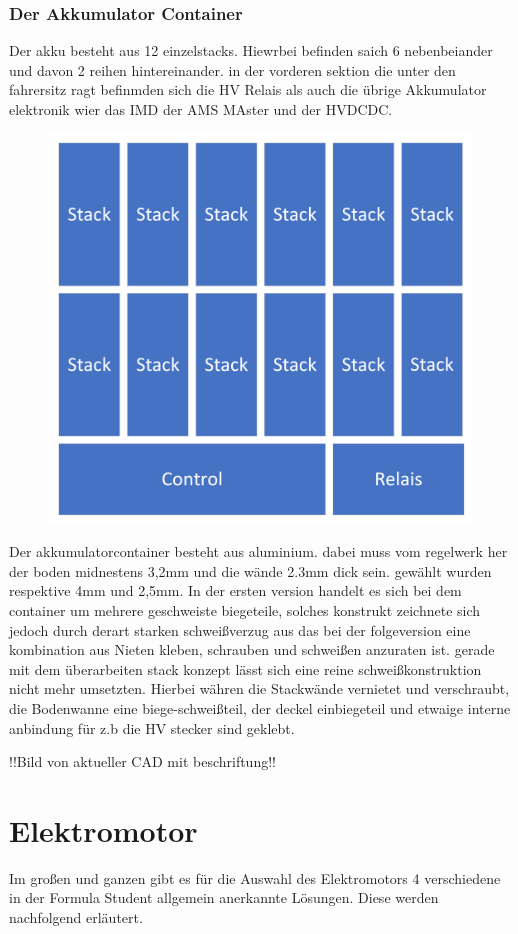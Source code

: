 \FloatBarrier
\subsubsection{Der Akkumulator Container}

Der akku besteht aus 12 einzelstacks. Hiewrbei befinden saich 6 nebenbeiander und davon 2 reihen hintereinander. in der vorderen sektion die unter den fahrersitz ragt befinmden sich die HV Relais als auch die übrige Akkumulator elektronik wier das IMD der AMS MAster und der HVDCDC.
\begin{figure}
	\centering
	\includegraphics[width=0.7\linewidth]{bilder/Akku_Layout}
	\caption{}
	\label{fig:akkulayout}
\end{figure}
Der akkumulatorcontainer besteht aus aluminium. dabei muss vom regelwerk her der boden midnestens 3,2mm und die wände 2.3mm dick sein. gewählt wurden respektive 4mm und 2,5mm. In der ersten version handelt es sich bei dem container um mehrere geschweiste biegeteile, solches konstrukt zeichnete sich jedoch durch derart starken schweißverzug aus das bei der folgeversion eine kombination aus Nieten kleben, schrauben und schweißen anzuraten ist. gerade mit dem überarbeiten stack konzept lässt sich eine reine schweißkonstruktion nicht mehr umsetzten. Hierbei währen die Stackwände vernietet und verschraubt, die Bodenwanne eine biege-schweißteil, der deckel einbiegeteil und etwaige interne anbindung für z.b die HV stecker sind geklebt.

!!Bild von aktueller CAD mit beschriftung!!

\section{Elektromotor}
Im großen und ganzen gibt es für die Auswahl des Elektromotors 4 verschiedene in der Formula Student allgemein anerkannte Lösungen. Diese werden nachfolgend erläutert.

